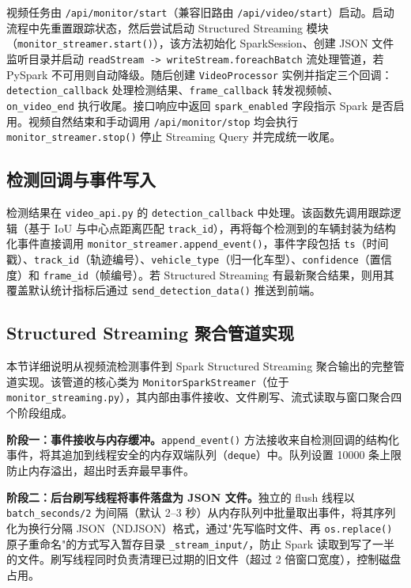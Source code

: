 \documentclass{wzuthesis} %
\begin{document}
视频任务由 \nolinkurl{/api/monitor/start}（兼容旧路由 \nolinkurl{/api/video/start}）启动。启动流程中先重置跟踪状态，然后尝试启动 Structured Streaming 模块（\nolinkurl{monitor_streamer.start()}），该方法初始化 SparkSession、创建 JSON 文件监听目录并启动 \nolinkurl{readStream -> writeStream.foreachBatch} 流处理管道，若 PySpark 不可用则自动降级。随后创建 \texttt{VideoProcessor} 实例并指定三个回调：\texttt{detection\_callback} 处理检测结果、\texttt{frame\_callback} 转发视频帧、\texttt{on\_video\_end} 执行收尾。接口响应中返回 \texttt{spark\_enabled} 字段指示 Spark 是否启用。视频自然结束和手动调用 \nolinkurl{/api/monitor/stop} 均会执行 \nolinkurl{monitor_streamer.stop()} 停止 Streaming Query 并完成统一收尾。

\subsection{检测回调与事件写入}

检测结果在 \texttt{video\_api.py} 的 \texttt{detection\_callback} 中处理。该函数先调用跟踪逻辑（基于 IoU 与中心点距离匹配 \texttt{track\_id}），再将每个检测到的车辆封装为结构化事件直接调用 \texttt{monitor\_streamer.append\_event()}，事件字段包括 \texttt{ts}（时间戳）、\texttt{track\_id}（轨迹编号）、\texttt{vehicle\_type}（归一化车型）、\texttt{confidence}（置信度）和 \texttt{frame\_id}（帧编号）。若 Structured Streaming 有最新聚合结果，则用其覆盖默认统计指标后通过 \texttt{send\_detection\_data()} 推送到前端。

\subsection{Structured Streaming 聚合管道实现}

本节详细说明从视频流检测事件到 Spark Structured Streaming 聚合输出的完整管道实现。该管道的核心类为 \texttt{MonitorSparkStreamer}（位于 \texttt{monitor\_streaming.py}），其内部由事件接收、文件刷写、流式读取与窗口聚合四个阶段组成。

\textbf{阶段一：事件接收与内存缓冲。}\texttt{append\_event()} 方法接收来自检测回调的结构化事件，将其追加到线程安全的内存双端队列（\texttt{deque}）中。队列设置 10000 条上限防止内存溢出，超出时丢弃最早事件。

\textbf{阶段二：后台刷写线程将事件落盘为 JSON 文件。}独立的 flush 线程以 \texttt{batch\_seconds/2} 为间隔（默认 2--3 秒）从内存队列中批量取出事件，将其序列化为换行分隔 JSON（NDJSON）格式，通过"先写临时文件、再 \texttt{os.replace()} 原子重命名"的方式写入暂存目录 \texttt{\_stream\_input/}，防止 Spark 读取到写了一半的文件。刷写线程同时负责清理已过期的旧文件（超过 2 倍窗口宽度），控制磁盘占用。
\end{document}
